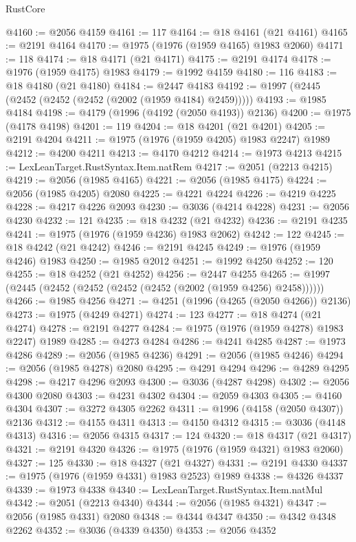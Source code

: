 \begin{lexlean}{RustCore}
\begin{coremodule}
@4160 := @2056 @4159
@4161 := 117
@4164 := @18 @4161 (@21 @4161)
@4165 := @2191 @4164
@4170 := @1975 (@1976 (@1959 @4165) @1983 @2060)
@4171 := 118
@4174 := @18 @4171 (@21 @4171)
@4175 := @2191 @4174
@4178 := @1976 (@1959 @4175) @1983
@4179 := @1992 @4159
@4180 := 116
@4183 := @18 @4180 (@21 @4180)
@4184 := @2447 @4183
@4192 := @1997 (@2445 (@2452 (@2452 (@2452 (@2002 (@1959 @4184) @2459)))))
@4193 := @1985 @4184
@4198 := @4179 (@1996 (@4192 (@2050 @4193)) @2136)
@4200 := @1975 (@4178 @4198)
@4201 := 119
@4204 := @18 @4201 (@21 @4201)
@4205 := @2191 @4204
@4211 := @1975 (@1976 (@1959 @4205) @1983 @2247) @1989
@4212 := @4200 @4211
@4213 := @4170 @4212
@4214 := @1973 @4213
@4215 := LexLeanTarget.RustSyntax.Item.natRem
@4217 := @2051 (@2213 @4215)
@4219 := @2056 (@1985 @4165)
@4221 := @2056 (@1985 @4175)
@4224 := @2056 (@1985 @4205) @2080
@4225 := @4221 @4224
@4226 := @4219 @4225
@4228 := @4217 @4226 @2093
@4230 := @3036 (@4214 @4228)
@4231 := @2056 @4230
@4232 := 121
@4235 := @18 @4232 (@21 @4232)
@4236 := @2191 @4235
@4241 := @1975 (@1976 (@1959 @4236) @1983 @2062)
@4242 := 122
@4245 := @18 @4242 (@21 @4242)
@4246 := @2191 @4245
@4249 := @1976 (@1959 @4246) @1983
@4250 := @1985 @2012
@4251 := @1992 @4250
@4252 := 120
@4255 := @18 @4252 (@21 @4252)
@4256 := @2447 @4255
@4265 := @1997 (@2445 (@2452 (@2452 (@2452 (@2452 (@2002 (@1959 @4256) @2458))))))
@4266 := @1985 @4256
@4271 := @4251 (@1996 (@4265 (@2050 @4266)) @2136)
@4273 := @1975 (@4249 @4271)
@4274 := 123
@4277 := @18 @4274 (@21 @4274)
@4278 := @2191 @4277
@4284 := @1975 (@1976 (@1959 @4278) @1983 @2247) @1989
@4285 := @4273 @4284
@4286 := @4241 @4285
@4287 := @1973 @4286
@4289 := @2056 (@1985 @4236)
@4291 := @2056 (@1985 @4246)
@4294 := @2056 (@1985 @4278) @2080
@4295 := @4291 @4294
@4296 := @4289 @4295
@4298 := @4217 @4296 @2093
@4300 := @3036 (@4287 @4298)
@4302 := @2056 @4300 @2080
@4303 := @4231 @4302
@4304 := @2059 @4303
@4305 := @4160 @4304
@4307 := @3272 @4305 @2262
@4311 := @1996 (@4158 (@2050 @4307)) @2136
@4312 := @4155 @4311
@4313 := @4150 @4312
@4315 := @3036 (@4148 @4313)
@4316 := @2056 @4315
@4317 := 124
@4320 := @18 @4317 (@21 @4317)
@4321 := @2191 @4320
@4326 := @1975 (@1976 (@1959 @4321) @1983 @2060)
@4327 := 125
@4330 := @18 @4327 (@21 @4327)
@4331 := @2191 @4330
@4337 := @1975 (@1976 (@1959 @4331) @1983 @2523) @1989
@4338 := @4326 @4337
@4339 := @1973 @4338
@4340 := LexLeanTarget.RustSyntax.Item.natMul
@4342 := @2051 (@2213 @4340)
@4344 := @2056 (@1985 @4321)
@4347 := @2056 (@1985 @4331) @2080
@4348 := @4344 @4347
@4350 := @4342 @4348 @2262
@4352 := @3036 (@4339 @4350)
@4353 := @2056 @4352

\end{coremodule}
\end{lexlean}
